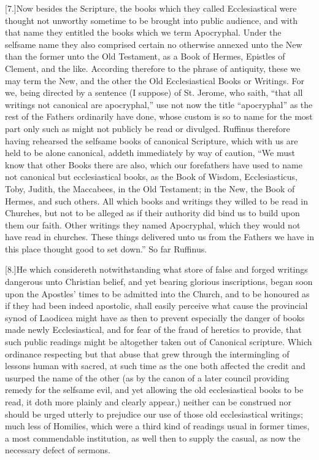 [7.]Now besides the Scripture, the books which they called Ecclesiastical were thought not unworthy sometime to be brought into public audience, and with that name they entitled the books which we term Apocryphal. Under the selfsame name they also comprised certain no otherwise annexed unto the New than the former unto the Old Testament, as a Book of Hermes, Epistles of Clement, and the like. According therefore to the phrase of antiquity, these we may term the New, and the other the Old Ecclesiastical Books or Writings. For we, being directed by a sentence (I suppose) of St. Jerome, who saith, “that all writings not canonical are apocryphal,” use not now the title “apocryphal” as the rest of the Fathers ordinarily have done, whose custom is so to name for the most part only such as might not publicly be read or divulged. Ruffinus therefore having rehearsed the selfsame books of canonical Scripture, which with us are held to be alone canonical, addeth immediately by way of caution, “We must know that other Books there are also, which our forefathers have used to name not canonical but ecclesiastical books, as the Book of Wisdom, Ecclesiasticus, Toby, Judith, the Maccabees, in the Old Testament; in the New, the Book of Hermes, and such others. All which books and writings  they willed to be read in Churches, but not to be alleged as if their authority did bind us to build upon them our faith.
 Other writings they named Apocryphal, which they would not have read in churches. These things delivered unto us from the Fathers we have in this place thought good to set down.” So far Ruffinus.

[8.]He which considereth notwithstanding what store of false and forged writings dangerous unto Christian belief, and yet bearing glorious inscriptions, began soon upon the Apostles’ times to be admitted into the Church, and to be honoured as if they had been indeed apostolic, shall easily perceive what cause the provincial synod of Laodicea might have as then to prevent especially the danger of books made newly Ecclesiastical, and for fear of the fraud of heretics to provide, that such public readings might be altogether taken out of Canonical scripture. Which ordinance respecting but that abuse that grew through the intermingling of lessons human with sacred, at such time as the one both affected the credit and usurped the name of the other (as by the canon of a later council providing remedy for the selfsame evil, and yet allowing the old ecclesiastical books to be read, it doth more plainly and clearly appear,) neither can be construed nor should be urged utterly to prejudice our use of those old ecclesiastical writings; much less of Homilies, which were a third kind of readings usual in former times, a most commendable  institution, as well then to supply the casual, as now the necessary defect of sermons.

